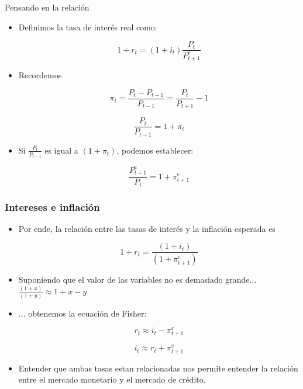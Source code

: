 \documentclass{beamer}
\begin{document}
\begin{frame}{Pensando en la relación}
    \begin{itemize}
        \item Definimos la tasa de interés real como:

            \[1+r_t=(1+i_t)\frac{P_t}{P_{t+1}^{e}}\]

        \item Recordemos

            \[\pi_t=\frac{P_t - P_{t-1}}{P_{t-1}}=\frac{P_t}{P_{t+1}} - 1\]

            \[\frac{P_t}{P_{t-1}}= 1 + \pi_t \]

        \item Si $\frac{P_t}{P_{t-1}}$ es igual a $(1 + \pi_t)$, podemos establecer:

            \[\frac{P_{t+1}^e}{P_{t}}= 1 + \pi_{t+1}^e \]

    \end{itemize}
\end{frame}

\begin{frame}
\frametitle{Intereses e inflación}
\begin{itemize}
    \item Por ende, la relación entre las tasas de interés y la inflación esperada es

        \[1+r_t=\frac{(1+i_t)}{(1+\pi_{t+1}^e)}\]

    \item Suponiendo que el valor de las variables no es demasiado grande... $\frac{(1+x)}{(1+y)} \approx 1 + x - y $
    \item ... obtenemos la ecuación de Fisher: 

        \[r_t \approx i_t - \pi_{t+1}^e\]

        \[i_t \approx r_t + \pi_{t+1}^e\]

    \item Entender que ambas tasas estan relacionadas nos permite entender la relación entre el mercado monetario y el mercado de crédito.
    \end{itemize}
\end{frame}
\end{document}
